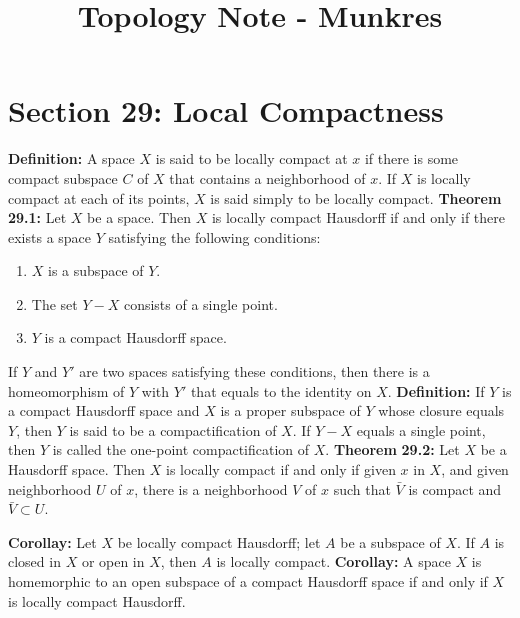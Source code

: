 \documentclass[12pt]{amsart}
\title{Topology Note - Munkres}
\newcommand{\df}{\textbf{Definition: }}
\newcommand{\thm}{\textbf{Theorem }}
\newcommand{\cor}{\textbf{Corollay: }}
\begin{document}
\maketitle

\section*{Section 29: Local Compactness}
\df A space $X$ is said to be locally compact at $x$ if there is some compact subspace $C$ of $X$ that contains a neighborhood of $x$. If $X$ is locally compact at each of its points, $X$ is said simply to be locally compact.
\smallbreak
\thm \textbf{29.1: } Let $X$ be a space. Then $X$ is locally compact Hausdorff if and only if there exists a space $Y$ satisfying the following conditions:
\begin{enumerate}
    \item $X$ is a subspace of $Y$.
    \item The set $Y - X$ consists of a single point.
    \item  $Y$ is a compact Hausdorff space.
\end{enumerate}
If $Y$ and $Y'$ are two spaces satisfying these conditions, then there is a homeomorphism of $Y$ with $Y'$ that equals to the identity on $X$.
\smallbreak
\df If $Y$ is a compact Hausdorff space and $X$ is a proper subspace of $Y$ whose closure equals $Y$, then $Y$ is said to be a compactification of $X$. If $Y-X$ equals a single point, then $Y$ is called the one-point compactification of $X$.
\smallbreak
\thm \textbf{29.2: } Let $X$ be a Hausdorff space. Then $X$ is locally compact if and only if given $x$ in $X$, and given neighborhood $U$ of $x$, there is a neighborhood $V$ of $x$ such that $\bar{V}$ is compact and $\bar{V}\subset U$.

\smallbreak
\cor Let $X$ be locally compact Hausdorff; let $A$ be a subspace of $X$. If $A$ is closed in $X$ or open in $X$, then $A$ is locally compact.
\smallbreak
\cor A space $X$ is homemorphic to an open subspace of a compact Hausdorff space if and only if $X$ is locally compact Hausdorff.
\pagebreak
\end{document}
